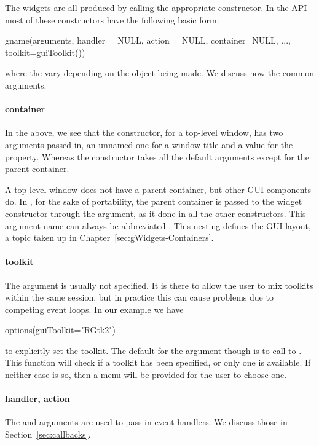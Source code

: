 The widgets are all produced by calling the appropriate constructor.
In the  API most of these constructors have the
following basic form:
\begin{Schunk}
\begin{Sinput}
 gname(arguments, handler = NULL, action = NULL, 
       container=NULL, ..., toolkit=guiToolkit())
\end{Sinput}
\end{Schunk}
where the  vary depending on the object being made. We
discuss now the common arguments.

\paragraph{container}
In the above, we see that the  constructor, for a
top-level window, has two arguments passed in, an unnamed one for a
window title and a value for the  property. Whereas the
 constructor takes all the default arguments except for
the parent container.

A top-level window does not have a parent container, but other GUI
components do. In , for the sake of portability, the
parent container is passed to the widget constructor through the
 argument, as it done in all the other constructors.
This argument name can always be abbreviated . This nesting
defines the GUI layout, a topic taken up in
Chapter~\ref{sec:gWidgets-Containers}.

\paragraph{toolkit}
The  argument is usually not specified. It is there to
allow the user to mix toolkits within the same \R\/ session, but in
practice this can cause problems due to competing event loops. 
In our example we have 
\begin{Schunk}
\begin{Sinput}
 options(guiToolkit="RGtk2")
\end{Sinput}
\end{Schunk}
%
to explicitly set the toolkit. The default for the 
argument though is to call to . This function
will check if a toolkit has been specified, or only one is
available. If neither case is so, then a menu will be provided for the
user to choose one.

\paragraph{handler, action}
The  and  arguments are used to pass in
event handlers. We discuss those in Section~\ref{sec:callbacks}.


